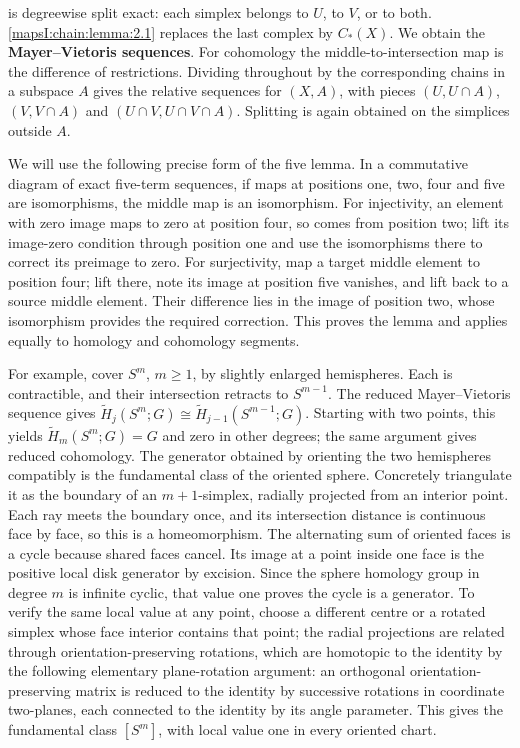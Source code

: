 \documentclass[11pt]{article}
\begin{document}
is degreewise split exact: each simplex belongs to \(U\), to \(V\), or to both. \cref{mapsI:chain:lemma:2.1} replaces the last complex by \(C_*(X)\). We obtain the \textbf{Mayer--Vietoris sequences}. For cohomology the middle-to-intersection map is the difference of restrictions. Dividing throughout by the corresponding chains in a subspace \(A\) gives the relative sequences for \((X,A)\), with pieces \((U,U\cap A)\), \((V,V\cap A)\) and \((U\cap V,U\cap V\cap A)\). Splitting is again obtained on the simplices outside \(A\).

We will use the following precise form of the five lemma. In a commutative diagram of exact five-term sequences, if maps at positions one, two, four and five are isomorphisms, the middle map is an isomorphism. For injectivity, an element with zero image maps to zero at position four, so comes from position two; lift its image-zero condition through position one and use the isomorphisms there to correct its preimage to zero. For surjectivity, map a target middle element to position four; lift there, note its image at position five vanishes, and lift back to a source middle element. Their difference lies in the image of position two, whose isomorphism provides the required correction. This proves the lemma and applies equally to homology and cohomology segments.

For example, cover \(S^m\), \(m\geq1\), by slightly enlarged hemispheres. Each is contractible, and their intersection retracts to \(S^{m-1}\). The reduced Mayer--Vietoris sequence gives
\(\widetilde H_j(S^m;G)\cong\widetilde H_{j-1}(S^{m-1};G)\).
Starting with two points, this yields \(\widetilde H_m(S^m;G)=G\) and zero in other degrees; the same argument gives reduced cohomology. The generator obtained by orienting the two hemispheres compatibly is the fundamental class of the oriented sphere. Concretely triangulate it as the boundary of an \(m+1\)-simplex, radially projected from an interior point. Each ray meets the boundary once, and its intersection distance is continuous face by face, so this is a homeomorphism. The alternating sum of oriented faces is a cycle because shared faces cancel. Its image at a point inside one face is the positive local disk generator by excision. Since the sphere homology group in degree \(m\) is infinite cyclic, that value one proves the cycle is a generator. To verify the same local value at any point, choose a different centre or a rotated simplex whose face interior contains that point; the radial projections are related through orientation-preserving rotations, which are homotopic to the identity by the following elementary plane-rotation argument: an orthogonal orientation-preserving matrix is reduced to the identity by successive rotations in coordinate two-planes, each connected to the identity by its angle parameter. This gives the fundamental class \([S^m]\), with local value one in every oriented chart.
\end{document}
